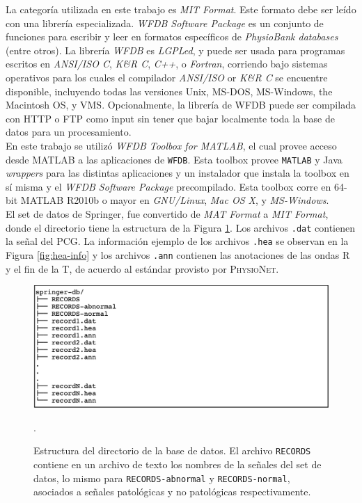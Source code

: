 \indent La categoría utilizada en este trabajo es \textit{MIT Format}. Este formato debe ser leído con una librería
especializada. \textit{WFDB Software Package} es un conjunto de funciones para escribir y leer en formatos
específicos de \textit{PhysioBank databases} (entre otros). La librería \textit{WFDB} es \textit{LGPLed}, y puede
ser usada para programas escritos en \textit{ANSI/ISO C}, \textit{K\&R C}, \textit{C++}, o \textit{Fortran},
corriendo bajo sistemas operativos para los cuales el compilador \textit{ANSI/ISO} or \textit{K\&R C} se encuentre
disponible, incluyendo todas las versiones Unix, MS-DOS, MS-Windows, the Macintosh OS, y VMS. Opcionalmente, la
librería de WFDB puede ser compilada con HTTP o FTP como input sin tener que bajar localmente toda la base de datos
para un procesamiento. \\
\indent En este trabajo se utilizó \textit{WFDB Toolbox for MATLAB\texttrademark}, el cual provee acceso desde
\textsc{MATLAB} a las aplicaciones de \texttt{WFDB}. Esta toolbox provee \texttt{MATLAB\texttrademark} y Java
\textit{wrappers} para las distintas aplicaciones y un instalador que instala la toolbox en sí misma y el
\textit{WFDB Software Package} precompilado. Esta toolbox corre en 64-bit \textsc{MATLAB\texttrademark} R2010b o
mayor en \textit{GNU/Linux}, \textit{Mac OS X}, y \textit{MS-Windows}. \\
\indent El set de datos de Springer, fue convertido de \textit{MAT Format} a \textit{MIT Format}, donde el
directorio tiene la estructura de la Figura \ref{fig:springer-db}. Los archivos \texttt{.dat} contienen la señal del
PCG. La información ejemplo de los archivos \texttt{.hea} se observan en la Figura \ref{fig:hea-info} y los archivos
\texttt{.ann} contienen las anotaciones de las ondas R y el fin de la T, de acuerdo al estándar provisto por
\textsc{PhysioNet}.

\begin{figure}[H]
  \centering
  \includegraphics[scale=0.73]{sections/chapter-03/images/springer-db.png}
  \caption[Estructura del directorio de la base de datos.]{Estructura del directorio de la base de datos. El
  archivo \texttt{RECORDS} contiene en un archivo de texto los nombres de la señales del set de datos, lo mismo
  para \texttt{RECORDS-abnormal} y \texttt{RECORDS-normal}, asociados a señales patológicas y no patológicas
  respectivamente.}.
  \label{fig:springer-db}
\end{figure}

